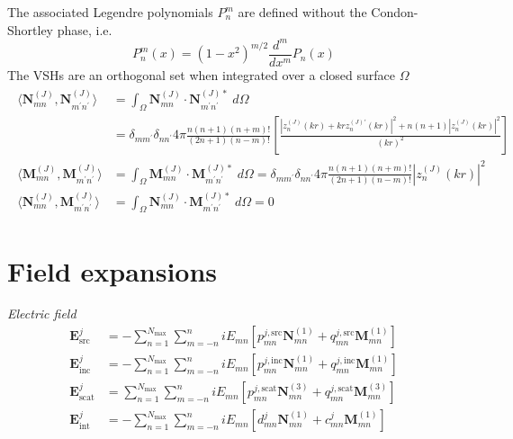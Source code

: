 \documentclass[11pt]{article}
\begin{document}
The associated Legendre polynomials $P_n^m$ are defined without the Condon-Shortley phase, i.e.
\begin{equation}
P_n^m(x) = (1 - x^2)^{m/2} \frac{d^m}{dx^m} P_n(x)
\end{equation}
The VSHs are an orthogonal set when integrated over a closed surface $\Omega$
\begin{align}
\begin{split}
    \langle \boldsymbol{N}_{mn}^{(J)}, \boldsymbol{N}_{m^\prime n^\prime}^{(J)} \rangle
    &= \int_\Omega \boldsymbol{N}_{mn}^{(J)} \cdot \boldsymbol{N}_{m^\prime n^\prime}^{(J)*} \;d\Omega \\
    &= \delta_{mm^\prime}\delta_{nn^\prime}4\pi \frac{n(n+1)(n+m)!}{(2n+1)(n-m)!}
      \left[ \frac{\left|z_n^{(J)}(kr) + krz_n^{(J)\prime}(kr)\right|^2 + n(n+1) \left|z_n^{(J)}(kr)\right|^2 }{(kr)^2} \right] \\
    \langle \boldsymbol{M}_{mn}^{(J)}, \boldsymbol{M}_{m^\prime n^\prime}^{(J)} \rangle
    &= \int_\Omega \boldsymbol{M}_{mn}^{(J)} \cdot \boldsymbol{M}_{m^\prime n^\prime}^{(J)*} \;d\Omega
    = \delta_{mm^\prime}\delta_{nn^\prime}4\pi \frac{n(n+1)(n+m)!}{(2n+1)(n-m)!} |z_n^{(J)}(kr)|^2 \\
    \langle \boldsymbol{N}_{mn}^{(J)}, \boldsymbol{M}_{m^\prime n^\prime}^{(J)} \rangle
    &= \int_\Omega \boldsymbol{N}_{mn}^{(J)} \cdot \boldsymbol{M}_{m^\prime n^\prime}^{(J)*} \;d\Omega = 0
\end{split}
\end{align}


\section{Field expansions}
\textit{Electric field}
\begin{subequations}
\begin{align}
    \boldsymbol{E}_\text{src}^j &= - \sum_{n=1}^{N_\text{max}} \sum_{m=-n}^{n}
    iE_{mn} \left[ p_{mn}^{j,\text{src}} \boldsymbol{N}_{mn}^{(1)} + q_{mn}^{j,\text{src}} \boldsymbol{M}_{mn}^{(1)} \right] \\
    \boldsymbol{E}_\text{inc}^j &= - \sum_{n=1}^{N_\text{max}} \sum_{m=-n}^{n}
    iE_{mn} \left[ p_{mn}^{j,\text{inc}} \boldsymbol{N}_{mn}^{(1)} + q_{mn}^{j,\text{inc}} \boldsymbol{M}_{mn}^{(1)} \right] \\
    \boldsymbol{E}_\text{scat}^j &= \sum_{n=1}^{N_\text{max}} \sum_{m=-n}^{n}
    iE_{mn} \left[p_{mn}^{j,\text{scat}} \boldsymbol{N}_{mn}^{(3)} + q_{mn}^{j,\text{scat}} \boldsymbol{M}_{mn}^{(3)} \right] \\
    \boldsymbol{E}_\text{int}^j &= - \sum_{n=1}^{N_\text{max}} \sum_{m=-n}^{n}
    iE_{mn} \left[ d_{mn}^j \boldsymbol{N}_{mn}^{(1)} + c_{mn}^j \boldsymbol{M}_{mn}^{(1)} \right]
\end{align}
\end{subequations}
\end{document}
